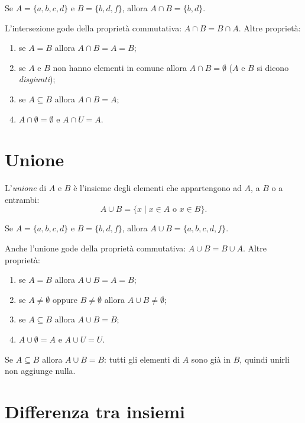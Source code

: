 \documentclass[11pt,a4paper]{article}
\begin{document}
\begin{esempio}
Se $A = \{a, b, c, d\}$ e $B = \{b, d, f\}$, allora $A \cap B = \{b, d\}$.
\end{esempio}

L'intersezione gode della proprietà commutativa: $A \cap B = B \cap A$.
Altre proprietà:
\begin{enumerate}
    \item se $A = B$ allora $A \cap B = A = B$;
    \item se $A$ e $B$ non hanno elementi in comune allora $A \cap B = \emptyset$ ($A$ e $B$ si dicono \emph{disgiunti});
    \item se $A \subseteq B$ allora $A \cap B = A$;
    \item $A \cap \emptyset = \emptyset$ e $A \cap U = A$.
\end{enumerate}
\section{Unione}

\begin{definizione}
L'\emph{unione} di $A$ e $B$ è l'insieme degli elementi che appartengono
ad $A$, a $B$ o a entrambi:
\[
A \cup B = \{x \mid x \in A \text{ o } x \in B\}.
\]
\end{definizione}

\begin{esempio}
Se $A = \{a, b, c, d\}$ e $B = \{b, d, f\}$, allora
$A \cup B = \{a, b, c, d, f\}$.
\end{esempio}

Anche l'unione gode della proprietà commutativa: $A \cup B = B \cup A$.
Altre proprietà:
\begin{enumerate}
    \item se $A = B$ allora $A \cup B = A = B$;
    \item se $A \neq \emptyset$ oppure $B \neq \emptyset$ allora $A \cup B \neq \emptyset$;
    \item se $A \subseteq B$ allora $A \cup B = B$;
    \item $A \cup \emptyset = A$ e $A \cup U = U$.
\end{enumerate}

\begin{esempio}
Se $A \subseteq B$ allora $A \cup B = B$: tutti gli elementi di $A$ sono già in $B$, quindi unirli non aggiunge nulla.
\end{esempio}

\section{Differenza tra insiemi}
\end{document}
